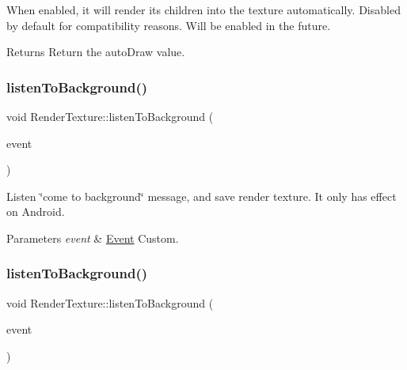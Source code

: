 When enabled, it will render its children into the texture automatically. Disabled by default for compatibility reasons. Will be enabled in the future.

\begin{DoxyReturn}{Returns}
Return the auto\+Draw value. 
\end{DoxyReturn}
\mbox{\label{classRenderTexture_a1ee79c4fa86ceae2511cd6ba4784f563}} 
\subsubsection{\texorpdfstring{listen\+To\+Background()}{listenToBackground()}\hspace{0.1cm}{\footnotesize\ttfamily [1/2]}}
{\footnotesize\ttfamily void Render\+Texture\+::listen\+To\+Background (\begin{DoxyParamCaption}\item[{\hyperlink{classEventCustom}{Event\+Custom} $\ast$}]{event }\end{DoxyParamCaption})}

Listen \char`\"{}come to background\char`\"{} message, and save render texture. It only has effect on Android.


\begin{DoxyParams}{Parameters}
{\em event} & \hyperlink{classEvent}{Event} Custom. \\
\hline
\end{DoxyParams}
\mbox{\label{classRenderTexture_a1ee79c4fa86ceae2511cd6ba4784f563}} 
\subsubsection{\texorpdfstring{listen\+To\+Background()}{listenToBackground()}\hspace{0.1cm}{\footnotesize\ttfamily [2/2]}}
{\footnotesize\ttfamily void Render\+Texture\+::listen\+To\+Background (\begin{DoxyParamCaption}\item[{\hyperlink{classEventCustom}{Event\+Custom} $\ast$}]{event }\end{DoxyParamCaption})}

